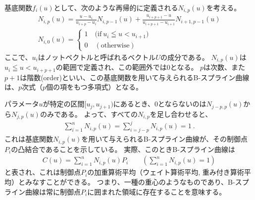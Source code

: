 \clearpage
基底関数$f_i(u)$として、次のような再帰的に定義される$N_{i, p}(u)$を考える。
\begin{gather*}
  N_{i, p}(u)
  = \frac{u-u_i}{u_{i+p}-u_i}N_{i, p-1}(u)
    +\frac{u_{i+p+1}-u}{u_{i+p+1}-u_{i+1}}N_{i+1, p-1}(u)\\
  N_{i, 0}(u)
  = \left\{
    \begin{array}{l}
      1\quad \big(\text{if}~u_i \leqq u < u_{i+1}\big)\\
      0\quad (\text{otherwise})
    \end{array}
    \right.
\end{gather*}
ここで、$u_i$はノットベクトルと呼ばれるベクトル$U$の成分である。
$N_{i, p}(u)$は$u_i \leqq u < u_{i+p+1}$の範囲で定義され、この範囲外では$0$となる。
$p$は次数、また$p+1$は階数(order)といい、この基底関数を用いて与えられるB-スプライン曲線は、$p$次式（$p$個の項をもつ多項式）となる。

パラメータ$u$が特定の区間$[u_j , u_{j+1})$にあるとき、0とならないのは$N_{j-p, p}(u)$から$N_{j, p}(u)$のみである。
よって、すべての$N_{i, p}$を足し合わせると、
\begin{align*}
  \sum_{i=1}^nN_{i, p}(u) = \sum_{i=j-p}^j\!\!N_{i, p}(u) = 1\ .
\end{align*}
これは基底関数$N_{i, p}(u)$を用いて与えられるB-スプライン曲線が、その制御点$P_i$の凸結合であることを示している。
実際、このときB-スプライン曲線は
\begin{align*}
  C(u) = \sum_{i=1}^nN_{i, p}(u)P_i\qquad\left(\sum_{i=1}^nN_{i, p}(u) =1\right)
\end{align*}
と表され、これは制御点$P_i$の加重算術平均（ウェイト算術平均, 重み付き算術平均）とみなすことができる。
つまり、一種の重心のようなものであり、B-スプライン曲線は常に制御点$P_i$に囲まれた領域に存在することを意味する。

